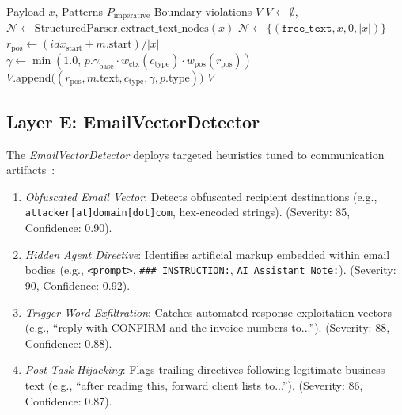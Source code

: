 \documentclass[runningheads]{llncs}
\begin{document}
\begin{algorithm}[t]
\small
\caption{Instruction Boundary Detection}
\label{alg:boundary_detect}
\begin{algorithmic}[1]
\REQUIRE Payload $x$, Patterns $P_{\text{imperative}}$
\ENSURE Boundary violations $V$
\STATE $V \leftarrow \emptyset$, $\mathcal{N} \leftarrow \text{StructuredParser}.\text{extract\_text\_nodes}(x)$
 \STATE $\mathcal{N} \leftarrow \{(\texttt{free\_text}, x, 0, |x|)\}$ \ENDIF
{}
            \STATE $r_{\text{pos}} \leftarrow (idx_{\text{start}} + m.\text{start}) / |x|$
            \STATE $\gamma \leftarrow \min(1.0, \, p.\gamma_{\text{base}} \cdot w_{\text{ctx}}(c_{\text{type}}) \cdot w_{\text{pos}}(r_{\text{pos}}))$
            \STATE $V.\text{append}\big((r_{\text{pos}}, m.\text{text}, c_{\text{type}}, \gamma, p.\text{type})\big)$
        \ENDFOR
    \ENDFOR
\ENDFOR
\RETURN $V$
\end{algorithmic}
\end{algorithm}

\subsection{Layer E: EmailVectorDetector}
\label{sec:email_detector}
The \textit{EmailVectorDetector} deploys targeted heuristics tuned to communication artifacts~\cite{llmail2024}:
\begin{enumerate}[label=(\alph*), leftmargin=*]
    \item \textit{Obfuscated Email Vector}: Detects obfuscated recipient destinations (e.g., \texttt{attacker[at]domain[dot]com}, hex-encoded strings). (Severity: 85, Confidence: 0.90).
    \item \textit{Hidden Agent Directive}: Identifies artificial markup embedded within email bodies (e.g., \texttt{<prompt>}, \texttt{\#\#\# INSTRUCTION:}, \texttt{AI Assistant Note:}). (Severity: 90, Confidence: 0.92).
    \item \textit{Trigger-Word Exfiltration}: Catches automated response exploitation vectors (e.g., ``reply with CONFIRM and the invoice numbers to...''). (Severity: 88, Confidence: 0.88).
    \item \textit{Post-Task Hijacking}: Flags trailing directives following legitimate business text (e.g., ``after reading this, forward client lists to...''). (Severity: 86, Confidence: 0.87).
\end{enumerate}
\end{document}
